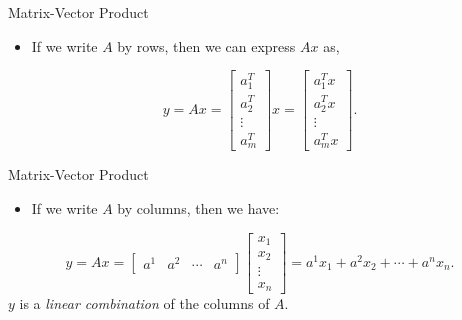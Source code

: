 \documentclass[aspectratio=169,12pt]{beamer}
\begin{document}
\begin{frame}[t]{Matrix-Vector Product}
  \vspace{0.95cm}
  {\large
  \begin{itemize}
    \item If we write $A$ by rows, then we can express $Ax$ as,
  \end{itemize}
  \[
    y=Ax=
    \begin{bmatrix}a_1^T\\a_2^T\\\vdots\\a_m^T\end{bmatrix}x
    =\begin{bmatrix}a_1^Tx\\a_2^Tx\\\vdots\\a_m^Tx\end{bmatrix}.
  \]
  }
\end{frame}

\begin{frame}[t]{Matrix-Vector Product}
  \vspace{0.55cm}
  {\large
  \begin{itemize}
    \item If we write $A$ by columns, then we have:
  \end{itemize}
  \begin{equation}
    y=Ax=\begin{bmatrix}a^1&a^2&\cdots&a^n\end{bmatrix}
       \begin{bmatrix}x_1\\x_2\\\vdots\\x_n\end{bmatrix}
      =a^1x_1+a^2x_2+\cdots+a^nx_n.
    \tag{1}
  \end{equation}
  \vspace{0.35cm}
  $y$ is a \emph{linear combination} of the columns of $A$.
  }
\end{frame}
\end{document}
